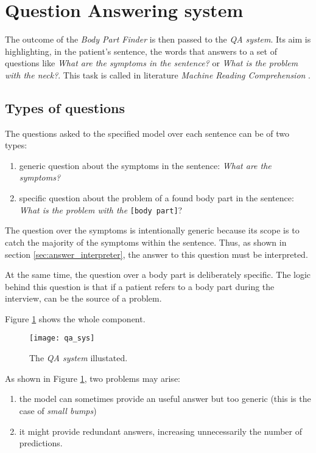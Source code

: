 \section{Question Answering system}
\label{sec:qa_system}
The outcome of the \textit{Body Part Finder} is then passed to the \textit{QA system}. Its aim is highlighting, in the patient's sentence, the words that answers to a set of questions like \textit{What are the symptoms in the sentence?} or \textit{What is the problem with the neck?}. This task is called in literature \textit{Machine Reading Comprehension} \cite{rnet}.

\subsection{Types of questions}
The questions asked to the specified model over each sentence can be of two types:
\begin{enumerate}
  \item generic question about the symptoms in the sentence: \textit{What are the symptoms?}
  \item specific question about the problem of a found body part in the sentence: \textit{What is the problem with the }\texttt{[body part]}?
\end{enumerate}

The question over the symptoms is intentionally generic because its scope is to catch the majority of the symptoms within the sentence. Thus, as shown in section \ref{sec:answer_interpreter}, the answer to this question must be interpreted.

At the same time, the question over a body part is deliberately specific. The logic behind this question is that if a patient refers to a body part during the interview, can be the source of a problem.

Figure \ref{fig:qa} shows the whole component.

\begin{figure}[h]
\centering
\texttt{[image: qa\_sys]}
\caption{The \textit{QA system} illustated.}
\medskip
\label{fig:qa}
\end{figure}

As shown in Figure \ref{fig:qa}, two problems may arise: 
\begin{enumerate}
  \item the model can sometimes provide an useful answer but too generic (this is the case of \textit{small bumps})
  \item it might provide redundant answers, increasing unnecessarily the number of predictions.
\end{enumerate}

